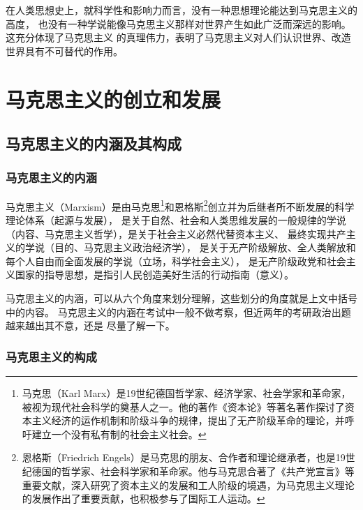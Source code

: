 \documentclass[11pt, UTF8]{book} %
\begin{document}
在人类思想史上，就科学性和影响力而言，没有一种思想理论能达到马克思主义的高度，
也没有一种学说能像马克思主义那样对世界产生如此广泛而深远的影响。这充分体现了马克思主义
的真理伟力，表明了马克思主义对人们认识世界、改造世界具有不可替代的作用。

\section{马克思主义的创立和发展}

\subsection{马克思主义的内涵及其构成}

\subsubsection{马克思主义的内涵}

马克思主义（Marxism）是由马克思\footnote{
    马克思（Karl Marx）是19世纪德国哲学家、经济学家、社会学家和革命家，被视为现代社会科学的奠基人之一。他的著作《资本论》等著名著作探讨了资本主义经济的运作机制和阶级斗争的规律，提出了无产阶级革命的理论，并呼吁建立一个没有私有制的社会主义社会。
}和恩格斯\footnote{
    恩格斯（Friedrich Engels）是马克思的朋友、合作者和理论继承者，也是19世纪德国的哲学家、社会科学家和革命家。他与马克思合著了《共产党宣言》等重要文献，深入研究了资本主义的发展和工人阶级的境遇，为马克思主义理论的发展作出了重要贡献，也积极参与了国际工人运动。
}创立并为后继者所不断发展的科学理论体系（起源与发展），
是关于自然、社会和人类思维发展的一般规律的学说（内容、马克思主义哲学），是关于社会主义必然代替资本主义、
最终实现共产主义的学说（目的、马克思主义政治经济学），
是关于无产阶级解放、全人类解放和每个人自由而全面发展的学说（立场，科学社会主义），
是无产阶级政党和社会主义国家的指导思想，是指引人民创造美好生活的行动指南（意义）。
\begin{remark}
    马克思主义的内涵，可以从六个角度来划分理解，这些划分的角度就是上文中括号中的内容。
    马克思主义的内涵在考试中一般不做考察，但近两年的考研政治出题越来越出其不意，还是
    尽量了解一下。
\end{remark}

\subsubsection{马克思主义的构成}
\end{document}
